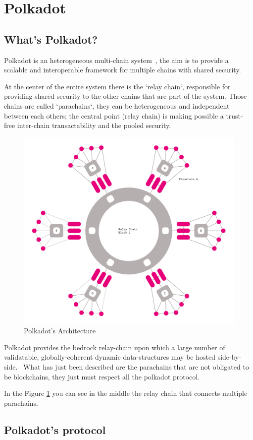 \documentclass[../main.tex]{subfiles}
\begin{document}
\section{Polkadot}
\subsection{What's Polkadot?}

Polkadot is an heterogeneous multi-chain system~\cite{wood2016polkadot}, the aim is to provide a scalable and interoperable framework for multiple chains with shared security.~\cite{burdges2020overview}

At the center of the entire system there is the `relay chain`, responsible for providing shared security to the other chains that are part of the system. Those chains are called `parachains`, they can be heterogeneous and independent between each others; the central point (relay chain) is making possible a trust-free inter-chain transactability and the pooled security.~\cite{burdges2020overview}

\begin{figure}[h]
  \centering
  \includegraphics[width=0.5\linewidth]{polkadot_architecture.png}
  \caption{Polkadot's Architecture}
  \label{fig:polkadot_arch}
\end{figure}

Polkadot provides the bedrock relay-chain upon which a large number of validatable, globally-coherent dynamic data-structures may be hosted side-by-side.~\cite{wood2016polkadot} What has just been described are the parachains that are not obligated to be blockchains, they just must respect all the polkadot protocol.

In the Figure \ref{fig:polkadot_arch} you can see in the middle the relay chain that connects multiple parachains.

\subsection{Polkadot's protocol}
\end{document}
